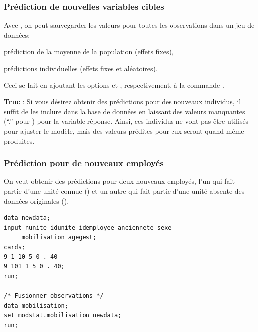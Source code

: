 \documentclass{beamer}
\begin{document}
%

\begin{frame}[fragile]
\frametitle{Prédiction de nouvelles variables cibles}
\bi
\item Avec , on peut sauvegarder les valeurs \alert{pour toutes les observations dans un jeu de données}:
\bi
\item prédiction de la moyenne de la population (effets fixes),
\item prédictions individuelles (effets fixes et aléatoires).
\ei
\item Ceci se fait en ajoutant les options 
et , respectivement, à la commande .
\item \textbf{Truc \SASlang{}}: Si vous désirez obtenir des prédictions pour des nouveaux
individus, il suffit de les inclure 
dans la base de données en laissant des
valeurs manquantes (``.'' pour \SASlang{}) pour la variable réponse. Ainsi, ces individus
ne vont pas être utilisés pour ajuster le modèle, mais des valeurs prédites pour
eux seront quand même produites.
\ei
\end{frame}

\begin{frame}[fragile]
\frametitle{Prédiction pour de nouveaux employés}
On veut obtenir des prédictions pour deux nouveaux employés, l'un qui fait partie d'une unité connue () et un autre qui fait partie d'une unité absente des données originales ().
\begin{tcolorbox}[colback=white, colframe=hecblue, title=Code \SASlang pour imputer deux nouvelles observations]
\begin{small}
\begin{verbatim}
data newdata;
input nunite idunite idemployee anciennete sexe
     mobilisation agegest;
cards;
9 1 10 5 0 . 40
9 101 1 5 0 . 40;
run;

/* Fusionner observations */
data mobilisation;
set modstat.mobilisation newdata;
run;
\end{verbatim}
\end{small}
\end{tcolorbox}
\end{frame}
\end{document}
